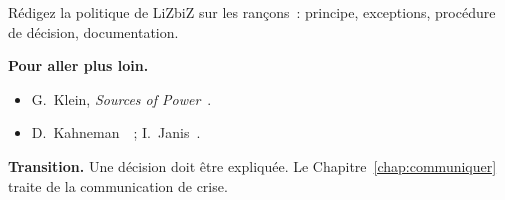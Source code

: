 \begin{boxexo}[title={\ding{45}\quad Exercice~23.10. La politique \niveauexpert}]
Rédigez la politique de LiZbiZ sur les rançons~: principe, exceptions,
procédure de décision, documentation.
\end{boxexo}

\bigskip

\begin{boxinfo}
\textbf{Pour aller plus loin.}
\begin{itemize}
    \item G.~Klein, \emph{Sources of Power}~\cite{klein1998}.
    \item D.~Kahneman~\cite{kahneman2011}~; I.~Janis~\cite{janis1972}.
\end{itemize}
\end{boxinfo}

\begin{boxinfo}
\textbf{Transition.} Une décision doit être expliquée. Le
Chapitre~\ref{chap:communiquer} traite de la communication de crise.
\end{boxinfo}
